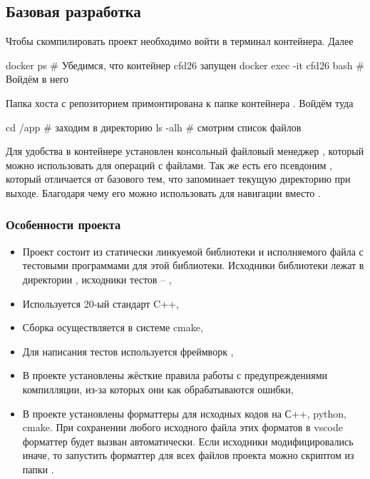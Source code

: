 \subsection{Базовая разработка}
\label{sec:howto_basic_dev}
Чтобы скомпилировать проект необходимо войти в терминал контейнера.
Далее
\begin{shelloutput}
docker ps                   # Убедимся, что контейнер cfd26 запущен
docker exec -it cfd26 bash  # Войдём в него
\end{shelloutput}
Папка хоста с репозиторием  примонтирована к папке контейнера .
Войдём туда
\begin{shelloutput}
cd /app   # заходим в директорию
ls -alh   # смотрим список файлов
\end{shelloutput}
Для удобства в контейнере установлен консольный файловый менеджер ,
который можно использовать для операций с файлами. Так же есть его псевдоним ,
который отличается от базового  тем, что запоминает текущую директорию при выходе.
Благодаря чему его можно использовать для навигации вместо .

\subsubsection{Особенности проекта}
\begin{itemize}
\item Проект состоит из статически линкуемой библиотеки  и исполняемого файла  с тестовыми программами для этой библиотеки.
      Исходники библиотеки лежат в директории , исходники тестов -- ,
\item Используется 20-ый стандарт C++,
\item Сборка осуществляется в системе cmake,
\item Для написания тестов используется фреймворк ,
\item В проекте установлены жёсткие правила работы с предупреждениями компилляции, из-за которых они как обрабатываются ошибки,
\item В проекте установлены форматтеры для исходных кодов на С++, python, cmake. При сохранении любого исходного файла этих форматов в vscode
      форматтер будет вызван автоматически. Если исходники модифицировались иначе, то запустить форматтер для всех файлов проекта
      можно скриптом  из папки .
\end{itemize}

